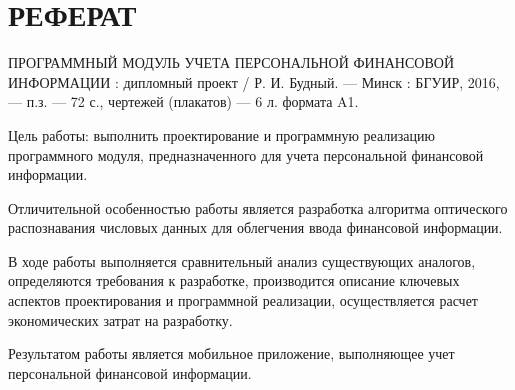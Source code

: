 \section*{РЕФЕРАТ}
\thispagestyle{empty}

ПРОГРАММНЫЙ МОДУЛЬ УЧЕТА ПЕРСОНАЛЬНОЙ ФИНАНСОВОЙ ИНФОРМАЦИИ :
дипломный проект / Р. И. Будный. --- Минск : БГУИР, 2016, --- п.з. ---
72 с., чертежей (плакатов) --- 6 л. формата A1.

Цель работы:
выполнить проектирование и программную реализацию программного модуля,
предназначенного для учета персональной финансовой информации.

Отличительной особенностью работы является разработка алгоритма
оптического распознавания числовых данных для облегчения ввода
финансовой информации.

В ходе работы выполняется сравнительный анализ существующих
аналогов, определяются требования к разработке,
производится описание ключевых аспектов проектирования
и программной реализации, осуществляется расчет экономических затрат на
разработку.

Результатом работы является мобильное приложение, выполняющее учет
персональной финансовой информации.

\pagebreak
